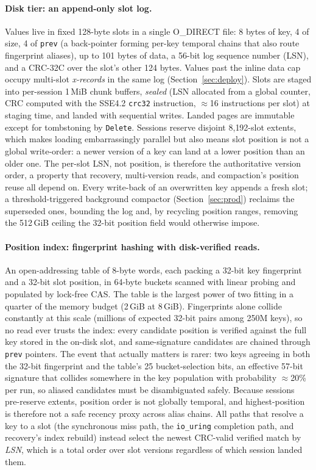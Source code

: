 \documentclass{article}
\newcommand{\NKeysShort}{250M}
\newcommand{\MemBudget}{8\,GiB}
\begin{document}
\paragraph{Disk tier: an append-only slot log.}
Values live in fixed 128-byte slots in a single O\_DIRECT file: 8 bytes of key, 4 of size, 4 of \texttt{prev} (a back-pointer forming per-key temporal chains that also route fingerprint aliases), up to 101 bytes of data, a 56-bit log sequence number (LSN), and a CRC-32C over the slot's other 124 bytes. Values past the inline data cap occupy multi-slot \emph{x-records} in the same log (Section~\ref{sec:deploy}). Slots are staged into per-session 1\,MiB chunk buffers, \emph{sealed} (LSN allocated from a global counter, CRC computed with the SSE4.2 \texttt{crc32} instruction, $\approx$16 instructions per slot) at staging time, and landed with sequential writes. Landed pages are immutable except for tombstoning by \texttt{Delete}. Sessions reserve disjoint 8{,}192-slot extents, which makes loading embarrassingly parallel but also means slot position is not a global write-order: a newer version of a key can land at a lower position than an older one. The per-slot LSN, not position, is therefore the authoritative version order, a property that recovery, multi-version reads, and compaction's position reuse all depend on. Every write-back of an overwritten key appends a fresh slot; a threshold-triggered background compactor (Section~\ref{sec:prod}) reclaims the superseded ones, bounding the log and, by recycling position ranges, removing the 512\,GiB ceiling the 32-bit position field would otherwise impose.

\paragraph{Position index: fingerprint hashing with disk-verified reads.}
An open-addressing table of 8-byte words, each packing a 32-bit key fingerprint and a 32-bit slot position, in 64-byte buckets scanned with linear probing and populated by lock-free CAS. The table is the largest power of two fitting in a quarter of the memory budget (2\,GiB at \MemBudget). Fingerprints alone collide constantly at this scale (millions of expected 32-bit pairs among \NKeysShort{} keys), so no read ever trusts the index: every candidate position is verified against the full key stored in the on-disk slot, and same-signature candidates are chained through \texttt{prev} pointers. The event that actually matters is rarer: two keys agreeing in both the 32-bit fingerprint and the table's 25 bucket-selection bits, an effective 57-bit signature that collides somewhere in the key population with probability $\approx$20\% per run, so aliased candidates must be disambiguated safely. Because sessions pre-reserve extents, position order is not globally temporal, and highest-position is therefore not a safe recency proxy across alias chains. All paths that resolve a key to a slot (the synchronous miss path, the \texttt{io\_uring} completion path, and recovery's index rebuild) instead select the newest CRC-valid verified match by \emph{LSN}, which is a total order over slot versions regardless of which session landed them.
\end{document}
